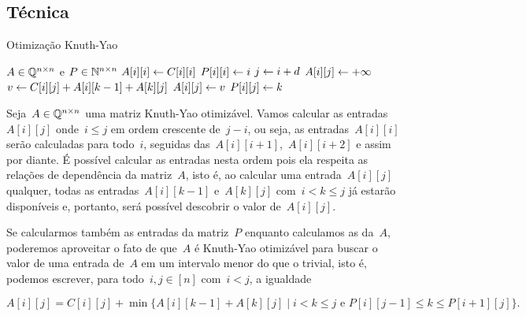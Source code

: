 
\subsection{Técnica}

\newcommand{\KY}{\textsc{KnuthYao}}
\begin{algorithm}[h]
\caption{Otimização Knuth-Yao}
\label{KY:algo}
\begin{algorithmic}[1]
\Function{\KY}{C, n}
    \State $A \in \mathbb{Q}^{n \times n}$ e $P \in \mathbb{N}^{n \times n}$
        \State $A[i][i] \leftarrow C[i][i]$
        \State $P[i][i] \leftarrow i$
    \EndFor
            \State $j \leftarrow i+d$
            \State $A[i][j] \leftarrow +\infty$
             \label{KY:algo:loop}
                \State $v \leftarrow C[i][j] + A[i][k-1] + A[k][j]$
                    \State $A[i][j] \leftarrow v$
                    \State $P[i][j] \leftarrow k$
                \EndIf
            \EndFor
        \EndFor
    \EndFor
\EndFunction
\end{algorithmic}
\end{algorithm}

Seja~$A \in \mathbb{Q}^{n \times n}$ uma matriz Knuth-Yao otimizável. Vamos calcular as entradas~$A[i][j]$ onde~$i \leq j$ em ordem crescente de~$j - i$, ou seja, as entradas~$A[i][i]$ serão calculadas para todo~$i$, seguidas das~$A[i][i+1]$,~$A[i][i+2]$ e assim por diante. É possível calcular as entradas nesta ordem pois ela respeita as relações de dependência da matriz~$A$, isto é, ao calcular uma entrada~$A[i][j]$ qualquer, todas as entradas~$A[i][k-1]$ e~$A[k][j]$ com~$i < k \leq j$ já estarão disponíveis e, portanto, será possível descobrir o valor de~$A[i][j]$.

Se calcularmos também as entradas da matriz~$P$ enquanto calculamos as da~$A$, poderemos aproveitar o fato de que~$A$ é Knuth-Yao otimizável para buscar o valor de uma entrada de~$A$ em um intervalo menor do que o trivial, isto é, podemos escrever, para todo~$i,j \in [n]$ com~$i < j$, a igualdade

\begin{equation} \label{KY:eq}
A[i][j] = C[i][j] + \min\{A[i][k-1] + A[k][j] \mid i < k \leq j \text{ e } P[i][j-1] \leq k \leq P[i+1][j]\} \text{.}
\end{equation}


